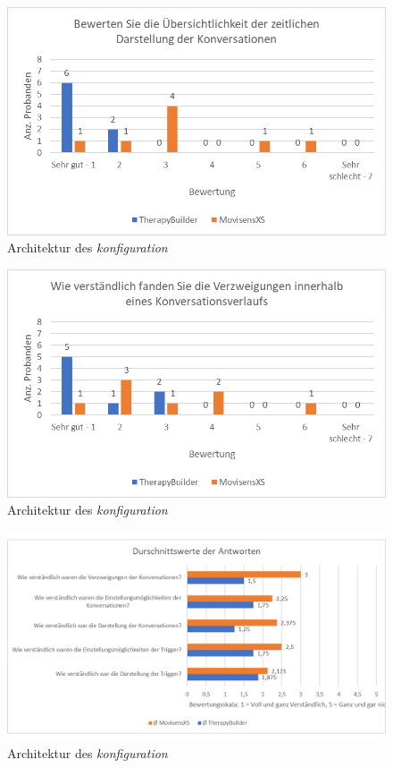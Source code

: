 \begin{figure}[!h]
\centering
\includegraphics[width=1\textwidth]{pictures/diagramme/konversationzeitldarstellung}
\caption{Architektur des \emph{konfiguration}}
\label{therapyBuilder}
\end{figure}

\begin{figure}[!h]
\centering
\includegraphics[width=1\textwidth]{pictures/diagramme/konvverzweig}
\caption{Architektur des \emph{konfiguration}}
\label{therapyBuilder}
\end{figure}







\begin{figure}[!h]
\centering
\includegraphics[width=1\textwidth]{pictures/diagramme/antwortendurchsch1}
\caption{Architektur des \emph{konfiguration}}
\label{therapyBuilder}
\end{figure}

